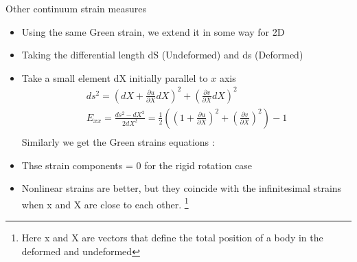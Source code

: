 	\begin{frame}{Other continuum strain measures}
		\begin{itemize}
			\item Using the same Green strain, we extend it in some way for 2D
			\item Taking the differential length dS (Undeformed) and ds (Deformed)
			\item Take a small element dX initially parallel to $x$ axis 			
			\begin{align*}
				ds^2 = \left(dX + \frac{\partial u}{\partial X} dX\right)^2 + \left(\frac{\partial v}{\partial X}dX \right)^2 \\				
				E_{xx} = \frac{ds^2-dX^2}{2dX^2} = \frac{1}{2} \left(\left(1 + \frac{\partial u}{\partial X} \right)^2 + \left(\frac{\partial v}{\partial X} \right)^2\right) - 1 \\
			\end{align*}
			Similarly we get the Green strains equations :
			
			
			\item Thse strain components = 0 for the rigid rotation case
			\item Nonlinear strains are better, but they coincide with the infinitesimal strains when x and X are close to each other. \footnote{Here x and X are vectors that define the total position of a body in the deformed and undeformed}
			
		\end{itemize}
	\end{frame}